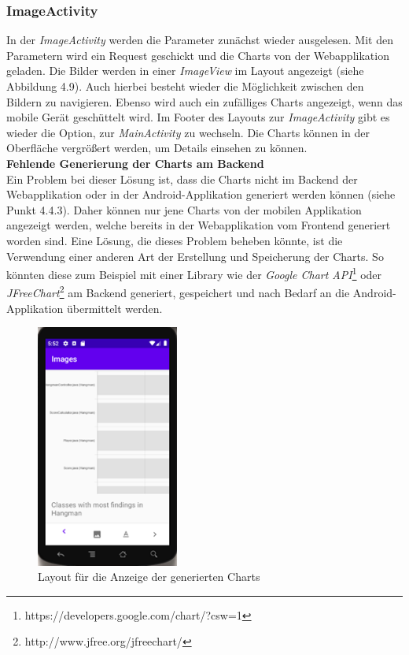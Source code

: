 \subsubsection{ImageActivity}
In der \textit{ImageActivity} werden die Parameter zunächst wieder ausgelesen. Mit den Parametern wird ein Request geschickt und die Charts von der Webapplikation geladen. Die Bilder werden in einer \textit{ImageView} im Layout angezeigt (siehe Abbildung 4.9). Auch hierbei besteht wieder die Möglichkeit zwischen den Bildern zu navigieren. Ebenso wird auch ein zufälliges Charts angezeigt, wenn das mobile Gerät geschüttelt wird. Im Footer des Layouts zur \textit{ImageActivity} gibt es wieder die Option, zur \textit{MainActivity} zu wechseln. Die Charts können in der Oberfläche vergrößert werden, um Details einsehen zu können.  \\
\textbf{Fehlende Generierung der Charts am Backend} \\
Ein Problem bei dieser Lösung ist, dass die Charts nicht im Backend der Webapplikation oder in der Android-Applikation generiert werden können (siehe Punkt 4.4.3). Daher können nur jene Charts von der mobilen Applikation angezeigt werden, welche bereits in der Webapplikation vom Frontend generiert worden sind. Eine Lösung, die dieses Problem beheben könnte, ist die Verwendung einer anderen Art der Erstellung und Speicherung der Charts. So könnten diese zum Beispiel mit einer Library wie der \textit{Google Chart API}\footnote{https://developers.google.com/chart/?csw=1} oder \textit{JFreeChart}\footnote{http://www.jfree.org/jfreechart/} am Backend generiert, gespeichert und nach Bedarf an die Android-Applikation übermittelt werden.
\begin{figure}[tp]
  \centering
  \includegraphics[height=8cm]{images/androidChart.PNG}
 \caption[Layout für die Anzeige der generierten Charts]{Layout für die Anzeige der generierten Charts}
  \label{fig:findingsInIDE}
\end{figure}

